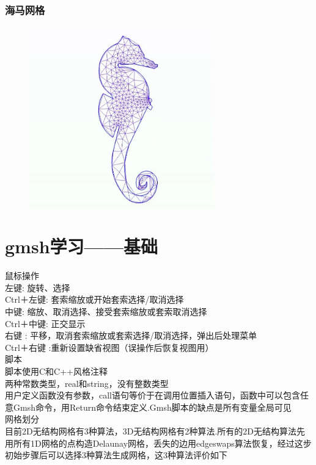 \documentclass[12pt]{article}
\begin{document}
\begin{CJK}{UTF8}{gkai}
\subsubsection{海马网格}

\begin{figure}[H]
	\centering
	\includegraphics[width=8cm]{haima1.png}
	\caption{}  		
\end{figure}
\section{gmsh学习——基础}

鼠标操作\\

左键:       旋转、选择\\
Ctrl＋左键: 套索缩放或开始套索选择/取消选择\\
中键:       缩放、取消选择、接受套索缩放或套索取消选择\\
Ctrl＋中键: 正交显示\\
右键 :      平移，取消套索缩放或套索选择/取消选择，弹出后处理菜单\\
Ctrl＋右键 :重新设置缺省视图（误操作后恢复视图用）\\

脚本\\

脚本使用C和C++风格注释\\
两种常数类型，real和string，没有整数类型\\
用户定义函数没有参数，call语句等价于在调用位置插入语句，函数中可以包含任意Gmsh命令，用Return命令结束定义.Gmsh脚本的缺点是所有变量全局可见\\

网格划分\\

目前2D无结构网格有3种算法，3D无结构网格有2种算法.所有的2D无结构算法先用所有1D网格的点构造Delaunay网格，丢失的边用edgeswaps算法恢复，经过这步初始步骤后可以选择3种算法生成网格，这3种算法评价如下\\


\end{CJK}
\end{document}
